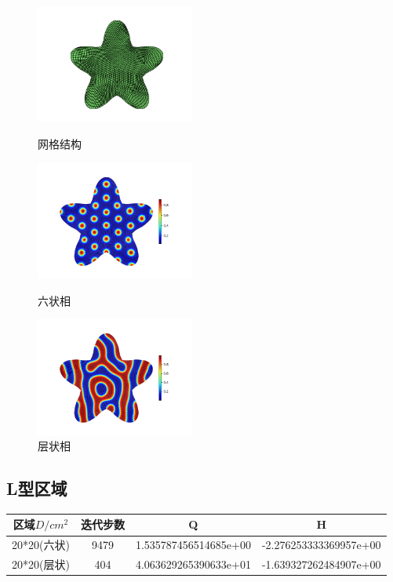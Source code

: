 \documentclass[12pt]{article}
\begin{document}
\begin{CJK}{UTF8}{gkai}
      \begin{figure}[H]
      	\setlength{\abovecaptionskip}{0.cm}
      	\setlength{\belowcaptionskip}{-0.cm}
      	\begin{minipage}[!htbp]{0.3\linewidth}
      		\includegraphics[width=5.2cm]{Figure_hc.png}
      		\caption*{网格结构}
      	\end{minipage}
      	\hspace{0.23in}
      	\begin{minipage}[!htbp]{0.3\linewidth}
      		\includegraphics[width=5.2cm]{scftfigure584.png}
      		\caption*{六状相}
      	\end{minipage}
      	\hspace{0.23in}
      	\begin{minipage}[!htbp]{0.3\linewidth}
      		\includegraphics[width=5.2cm]{scftfigure1740.png}
      		\caption*{层状相}
      	\end{minipage}
      \end{figure} 
    
  \subsection{L型区域}   
  \begin{table}[H]
  		\centering
  	\begin{tabular}{cccc}
  		\toprule
  		区域$D/cm^2$ &	迭代步数 & Q &  H \\
  		\midrule
  		20*20(六状)&9479 &1.535787456514685e+00 & -2.276253333369957e+00\\
  		20*20(层状)&404& 4.063629265390633e+01 & -1.639327262484907e+00\\
  		\bottomrule
  	\end{tabular}
  \end{table}
  

\end{CJK}
\end{document}
